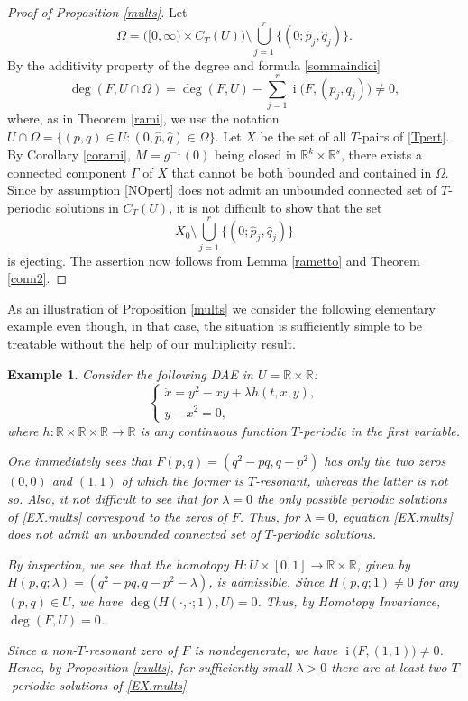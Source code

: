 \documentclass[a4paper]{amsart}
\numberwithin{equation}{section}
\newtheorem{example}[theorem]{Example}
\DeclareMathOperator{\idx}{\mathrm{i}}
\newcommand{\R}{\mathbb{R}}
\begin{document}
\begin{proof}[Proof of Proposition \ref{mults}]
 Let
\[
 \Omega=\Big([0,\infty)\times C_T(U)\Big)\setminus 
         \bigcup_{j=1}^{r}\{(0;\hat p_j,\hat q_j)\}.
\]
By the additivity property of the degree and formula \eqref{sommaindici}
\[
 \deg(F,U\cap\Omega)=\deg(F,U)-\sum_{j=1}^{r} \idx\big(F,(p_j,q_j)\big)\neq 0,
\]
where, as in Theorem \ref{rami}, we use the notation $U\cap\Omega=\{(p,q)\in U:
(0,\hat p,\hat q)\in\Omega\}$.
Let $X$ be the set of all $T$-pairs of \eqref{Tpert}. By Corollary \ref{corami}, 
$M=g^{-1}(0)$ being closed in $\R^k\times\R^s$, there exists a connected component 
$\Gamma$ of $X$ that cannot be both bounded and contained in $\Omega$. Since
by assumption \eqref{NOpert} does not admit an unbounded connected set of 
$T$-periodic solutions in $C_T(U)$, it is not difficult to show that the set 
\[
X_0\setminus\bigcup_{j=1}^{r}\{(0;\hat p_j,\hat q_j)\}
\]
is ejecting. The assertion now follows from Lemma \ref{rametto} and Theorem \ref{conn2}.
\end{proof}

As an illustration of Proposition \ref{mults} we consider the following elementary example
even though, in that case, the situation is sufficiently simple to be treatable without the 
help of our multiplicity result.

\begin{example}
 Consider the following DAE in $U=\R\times\R$:
\begin{equation}\label{EX.mults}
 \left\{
\begin{array}{l}
 \dot x = y^2-xy+\lambda h(t,x,y),\\
 y-x^2=0,
\end{array}
\right.
\end{equation}
where $h:\R\times\R\times\R\to\R$ is any continuous function $T$-periodic in the first
variable. 

One immediately sees that $F(p,q)=(q^2-pq,q-p^2)$ has only the two zeros $(0,0)$ and $(1,1)$ 
of which the former is $T$-resonant, whereas the latter is not so. Also, it not difficult to 
see that for $\lambda=0$ the only possible periodic solutions of \eqref{EX.mults} correspond 
to the zeros of $F$. Thus, for $\lambda=0$, equation \eqref{EX.mults} does not admit an 
unbounded connected set of $T$-periodic solutions. 

By inspection, we see that the homotopy $H:U\times[0,1]\to\R\times\R$, given by 
$H(p,q;\lambda)=(q^2-pq,q-p^2-\lambda)$, is admissible. Since $H(p,q;1)\neq 0$ for
any $(p,q)\in U$, we have $\deg\big(H(\cdot,\cdot;1),U\big)=0$. Thus, by Homotopy Invariance, $\deg(F,U)=0$.
 
Since a non-$T$-resonant zero of $F$ is nondegenerate, we have $\idx\big(F,(1,1)\big)\neq 0$. 
Hence, by Proposition \ref{mults}, for sufficiently small $\lambda>0$ there are at least two 
$T$-periodic solutions of \eqref{EX.mults}
\end{example}
\end{document}
